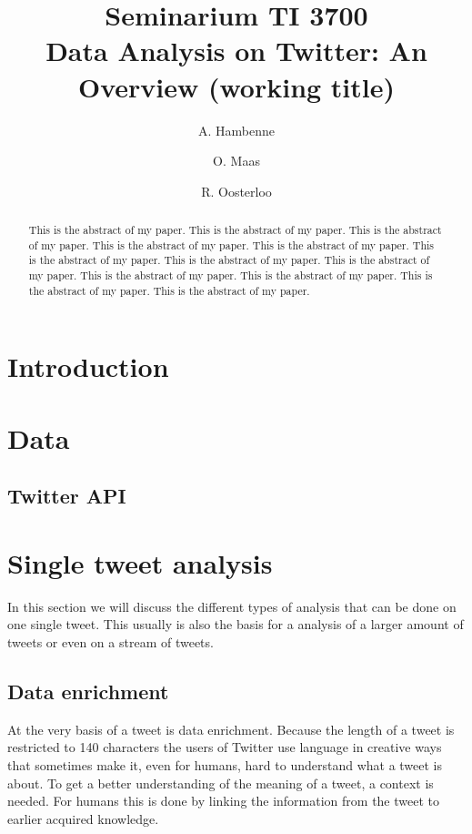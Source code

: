 \documentclass{article}
\title{Seminarium TI 3700\\ Data Analysis on Twitter: An Overview (working title)}
\author{A. Hambenne  \and
    O. Maas \and
    R. Oosterloo}
\date{}
\begin{document}
\maketitle
\thispagestyle{empty}

\begin{abstract}
This is the abstract of my paper.
This is the abstract of my paper.
This is the abstract of my paper.
This is the abstract of my paper.
This is the abstract of my paper.
This is the abstract of my paper.
This is the abstract of my paper.
This is the abstract of my paper.
This is the abstract of my paper.
This is the abstract of my paper.
This is the abstract of my paper.
This is the abstract of my paper.
\end{abstract}


\section{Introduction}


\section{Data}

\subsection{Twitter API}
\section{Single tweet analysis}
In this section we will discuss the different types of analysis that can be done on one single tweet. This usually is also the basis for a analysis of a larger amount of tweets or even on a stream of tweets. 
\subsection{Data enrichment}
At the very basis of a tweet is data enrichment. Because the length of a tweet is restricted to 140 characters the users of Twitter use language in creative ways that sometimes make it, even for humans, hard to understand what a tweet is about. To get a better understanding of the meaning of a tweet, a context is needed. For humans this is done by linking the information from the tweet to earlier acquired knowledge.
\end{document}
